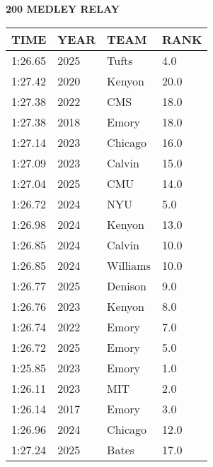 \begin{center}
\begin{minipage}[t]{0.7\textwidth}
\centering
\textbf{200 MEDLEY RELAY}\\[0.05cm]
\begin{tabular}{@{}p{1.8cm}p{1.2cm}p{1.4cm}p{0.8cm}@{}}
\hline
\textbf{TIME} & \textbf{YEAR} & \textbf{TEAM} & \textbf{RANK} \\
\hline
1:26.65 & 2025 & Tufts & 4.0 \\
1:27.42 & 2020 & Kenyon & 20.0 \\
1:27.38 & 2022 & CMS & 18.0 \\
1:27.38 & 2018 & Emory & 18.0 \\
1:27.14 & 2023 & Chicago & 16.0 \\
1:27.09 & 2023 & Calvin & 15.0 \\
1:27.04 & 2025 & CMU & 14.0 \\
1:26.72 & 2024 & NYU & 5.0 \\
1:26.98 & 2024 & Kenyon & 13.0 \\
1:26.85 & 2024 & Calvin & 10.0 \\
1:26.85 & 2024 & Williams & 10.0 \\
1:26.77 & 2025 & Denison & 9.0 \\
1:26.76 & 2023 & Kenyon & 8.0 \\
1:26.74 & 2022 & Emory & 7.0 \\
1:26.72 & 2025 & Emory & 5.0 \\
1:25.85 & 2023 & Emory & 1.0 \\
1:26.11 & 2023 & MIT & 2.0 \\
1:26.14 & 2017 & Emory & 3.0 \\
1:26.96 & 2024 & Chicago & 12.0 \\
1:27.24 & 2025 & Bates & 17.0 \\
\hline
\end{tabular}
\end{minipage}
\end{center}

\vspace{0.4cm}

